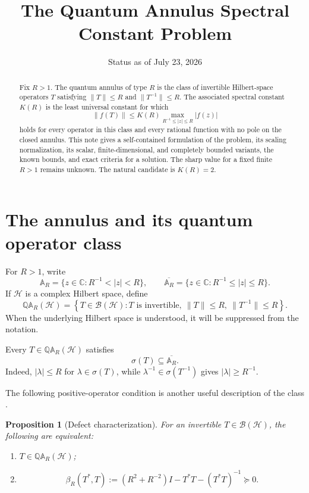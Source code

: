 \documentclass[11pt]{article}
\title{The Quantum Annulus Spectral Constant Problem}
\author{}
\date{Status as of July 23, 2026}
\newtheorem{proposition}[theorem]{Proposition}
\theoremstyle{definition}
\theoremstyle{remark}
\newcommand{\C}{\mathbb C}
\newcommand{\AR}{\mathbb A_R}
\newcommand{\QAR}{\mathbb Q\mathbb A_R}
\newcommand{\id}{I}
\newcommand{\spec}{\sigma}
\begin{document}
\maketitle

\begin{abstract}
Fix \(R>1\).  The quantum annulus of type \(R\) is the class of
invertible Hilbert-space operators \(T\) satisfying
\(\|T\|\leq R\) and \(\|T^{-1}\|\leq R\).  The associated spectral
constant \(K(R)\) is the least universal constant for which
\[
 \|f(T)\|
 \leq K(R)\max_{R^{-1}\leq |z|\leq R}|f(z)|
\]
holds for every operator in this class and every rational function
with no pole on the closed annulus.  This note gives a self-contained
formulation of the problem, its scaling normalization, its scalar,
finite-dimensional, and completely bounded variants, the known
bounds, and exact criteria for a solution.  The sharp value for a
fixed finite \(R>1\) remains unknown.  The natural candidate is
\(K(R)=2\).
\end{abstract}

\section{The annulus and its quantum operator class}

For \(R>1\), write
\[
 \AR=\{z\in\C:R^{-1}<|z|<R\},
 \qquad
 \overline{\AR}=\{z\in\C:R^{-1}\leq |z|\leq R\}.
\]
If \(\mathcal H\) is a complex Hilbert space, define
\begin{equation}
 \QAR(\mathcal H)
 =
 \left\{
 T\in\mathcal B(\mathcal H):
 T\text{ is invertible},\
 \|T\|\leq R,\
 \|T^{-1}\|\leq R
 \right\}.
 \label{eq:quantum-annulus}
\end{equation}
When the underlying Hilbert space is understood, it will be suppressed
from the notation.

Every \(T\in\QAR(\mathcal H)\) satisfies
\[
 \spec(T)\subseteq\overline{\AR}.
\]
Indeed, \(|\lambda|\leq R\) for \(\lambda\in\spec(T)\), while
\(\lambda^{-1}\in\spec(T^{-1})\) gives \(|\lambda|\geq R^{-1}\).

The following positive-operator condition is another useful
description of the class \cite{McCulloughPascoe2023}.

\begin{proposition}[Defect characterization]
\label{prop:defect-characterization}
For an invertible \(T\in\mathcal B(\mathcal H)\), the following are
equivalent:
\begin{enumerate}
 \item \(T\in\QAR(\mathcal H)\);
 \item
 \begin{equation}
  \beta_R(T^*,T)
  :=
  (R^2+R^{-2})\id
  -T^*T-(T^*T)^{-1}
  \succeq0.
  \label{eq:beta-defect}
 \end{equation}
\end{enumerate}
\end{proposition}
\end{document}
